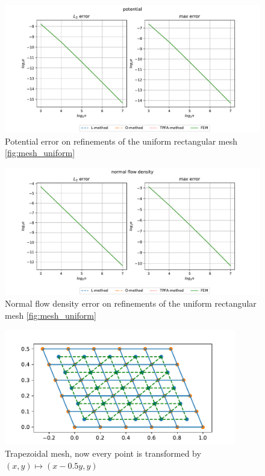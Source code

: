 \documentclass[../Main/main.tex]{subfiles}
\begin{document}
		\begin{figure}[H]
					\advance\leftskip-1cm
			\includegraphics[width=1.2\textwidth]{pressure_quadratic.pdf}
			\caption{Potential error on refinements of the uniform rectangular mesh \ref{fig:mesh_uniform}}
			\label{fig:mesh_uniform_potential}
		\end{figure}
		\begin{figure}[H]
			
			\advance\leftskip-1cm
			\includegraphics[width=1.2\textwidth]{flow_quadratic.pdf}
			\caption{Normal flow density error on refinements of the uniform rectangular mesh \ref{fig:mesh_uniform}}
			\label{fig:mesh_uniform_flow}
		\end{figure}

		\begin{figure}[H]
			\centering
			\includegraphics[width=0.9\textwidth]{mesh_trapezoidal.pdf}
			\caption{Trapezoidal mesh, now every point is transformed by $(x,y)  \mapsto (x-0.5y,y)$}
			\label{fig:mesh_trapezoidal}
		\end{figure}
	
\end{document}
